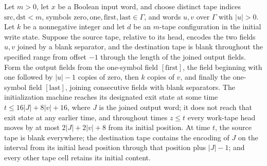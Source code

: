 \begin{theorem}
\label{Turing.rt_initRest_run}
\leanok
{}
Let $m>0$, let $x$ be a Boolean input word, and choose distinct tape indices
$\mathrm{src},\mathrm{dst}<m$, symbols
$\mathrm{zero},\mathrm{one},\mathrm{first},\mathrm{last}\in\Gamma$, and words $u,v$ over
$\Gamma$ with $|u|>0$. Let $k$ be a nonnegative integer and let $d$ be an $m$-tape
configuration in the initial write state. Suppose the source tape, relative to its head,
encodes the two fields $u,v$ joined by a blank separator, and the destination tape is
blank throughout the specified range from offset $-1$ through the length of the joined
output fields. Form the output fields from the one-symbol field $[\mathrm{first}]$, the
field beginning with $\mathrm{one}$ followed by $|u|-1$ copies of $\mathrm{zero}$, then
$k$ copies of $v$, and finally the one-symbol field $[\mathrm{last}]$, joining
consecutive fields with blank separators. The initialization machine reaches its
designated exit state at some time $t\le 16|J|+8|v|+16$, where $J$ is the joined output
word; it does not reach that exit state at any earlier time, and throughout times $z\le
t$ every work-tape head moves by at most $2|J|+2|v|+8$ from its initial position. At
time $t$, the source tape is blank everywhere; the destination tape contains the
encoding of $J$ on the interval from its initial head position through that position
plus $|J|-1$; and every other tape cell retains its initial content.
\end{theorem}

